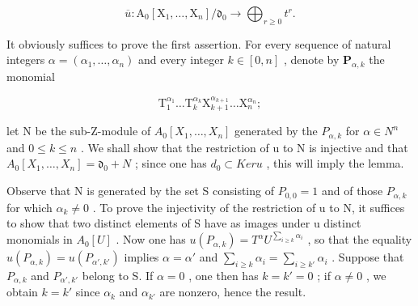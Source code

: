\[
\overline {{u}}: \mathrm{A} _ {0} [ \mathrm{X} _ {1}, \dots , \mathrm{X} _ {n} ] / \mathfrak {d} _ {0} \rightarrow \bigoplus_ {r \geqslant 0} t ^ {r}.
\]

It obviously suffices to prove the first assertion. For every sequence of natural integers \(\alpha = (\alpha_{1},\ldots,\alpha_{n})\) and every integer \(k\in[0,n]\) , denote by \(\mathbf{P}_{\alpha,k}\) the monomial

\[
\mathrm{T} _ {1} ^ {\alpha_ {1}} \dots \mathrm{T} _ {k} ^ {\alpha_ {k}} \mathrm{X} _ {k + 1} ^ {\alpha_ {k + 1}} \dots \mathrm{X} _ {n} ^ {\alpha_ {n}};
\]

let N be the sub-Z-module of \(A_{0}[X_{1}, \ldots, X_{n}]\) generated by the \(P_{\alpha,k}\) for \(\alpha \in N^{n}\) and \(0 \leqslant k \leqslant n\) . We shall show that the restriction of u to N is injective and that \(A_{0}[X_{1}, \ldots, X_{n}] = \mathfrak{d}_{0} + N\) ; since one has \(d_{0} \subset Ker u\) , this will imply the lemma.

Observe that N is generated by the set S consisting of \(P_{0,0} = 1\) and of those \(P_{\alpha,k}\) for which \(\alpha_k \neq 0\) . To prove the injectivity of the restriction of u to N, it suffices to show that two distinct elements of S have as images under u distinct monomials in \(A_0[U]\) . Now one has \(u(P_{\alpha,k}) = T^\alpha U^{\sum_{i \geq k} \alpha_i}\) , so that the equality \(u(P_{\alpha,k}) = u(P_{\alpha',k'})\) implies \(\alpha = \alpha'\) and \(\sum_{i \geq k} \alpha_i = \sum_{i \geq k'} \alpha_i\) . Suppose that \(P_{\alpha,k}\) and \(P_{\alpha',k'}\) belong to S. If \(\alpha = 0\) , one then has \(k = k' = 0\) ; if \(\alpha \neq 0\) , we obtain \(k = k'\) since \(\alpha_k\) and \(\alpha_{k'}\) are nonzero, hence the result.

